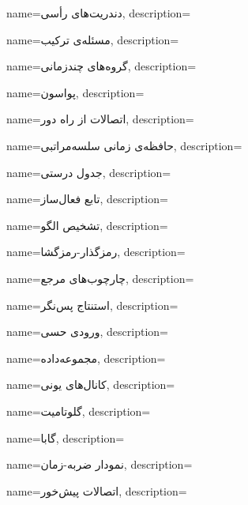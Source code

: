 {
name={دندریت‌های رأسی},
description=\hfill{}
}

{
	name={مسئله‌ی ترکیب},
	description=\hfill{}
}

{
name={گروه‌های چند‌زمانی},
description=\hfill{}
}


{
	name={پواسون},
	description=\hfill{}
}


{
	name={اتصالات از راه دور},
	description=\hfill{}
}

{
	name={حافظه‌ی زمانی سلسه‌مراتبی},
	description=\hfill{}
}

{
	name={جدول درستی},
	description=\hfill{}
}

{
	name={تابع فعال‌ساز},
	description=\hfill{}
}

{
	name={تشخیص الگو},
	description=\hfill{}
}


{
	name={رمزگذار-رمزگشا},
	description=\hfill{}
}


{
	name={چارچوب‌های مرجع},
	description=\hfill{}
}

{
name={استنتاج پس‌نگر},
description=\hfill{}
}

{
	name={ورودی حسی},
	description=\hfill{}
}

{
	name={مجموعه‌داده},
	description=\hfill{}
}


{
	name={کانا‌ل‌های یونی},
	description=\hfill{}
}



{
	name={گلوتامیت},
	description=\hfill{}
}

{
	name={گابا},
	description=\hfill{}
}

{
name={نمودار ضربه-زمان},
description=\hfill{}
}

{
name={اتصالات پیش‌خور},
description=\hfill{}
}

